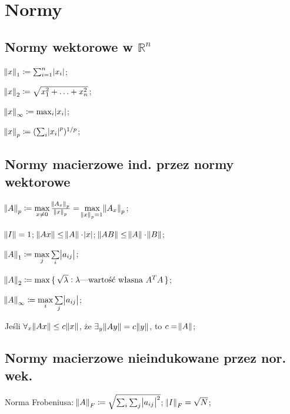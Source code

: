 \section{Normy}

\subsection{Normy wektorowe w $\mathbb{R}^n$}

\entry
$\norm{x}_1 \coloneqq \sum^n_{i=1}\abs{x_i}$;

\entry
$\norm{x}_2 \coloneqq \sqrt{x_1^2+\ldots + x_n^2}$;

\entry
$\norm{x}_\infty \coloneqq \max_{i}\abs{x_i}$;

\entry
$\norm{x}_p \coloneqq (\sum_i\abs{x_i}^p)^{1/p}$;

\subsection{Normy macierzowe ind. przez normy wektorowe}

\entry
$\norm{A}_p \coloneqq \max\limits_{x\neq 0} \frac{\norm{A_x}_p}{\norm{x}_p} = \max\limits_{\norm{x}_p = 1} \norm{A_x}_p$;

\entry
$\norm{I} = 1$;
\entry
$\norm{Ax} \leq \norm{A} \cdot \abs{x}$;
\entry
$\norm{AB} \leq \norm{A} \cdot \norm{B}$;

\entry
$\norm{A}_1 \coloneqq \max\limits_j\sum\limits_i\abs{a_{ij}}$;

\entry
$\norm{A}_2 \coloneqq \max\set{\sqrt{\lambda} : \lambda\text{---wartość własna } A^TA}$;

\entry
$\norm{A}_\infty \coloneqq \max\limits_i\sum\limits_j\abs{a_{ij}}$;

\entry
Jeśli $\forall_{x} \norm{Ax}\leq c\norm{x}$, że $\exists_y \norm{Ay} = c\norm{y}$, to $c=\norm{A}$;

\subsection{Normy macierzowe nieindukowane przez nor. wek.}

\entry
Norma Frobeniusa: $\norm{A}_F \coloneqq \sqrt{\sum_i\sum_j\abs{a_{ij}}^2}$; $\norm{I}_F=\sqrt{N}$;


